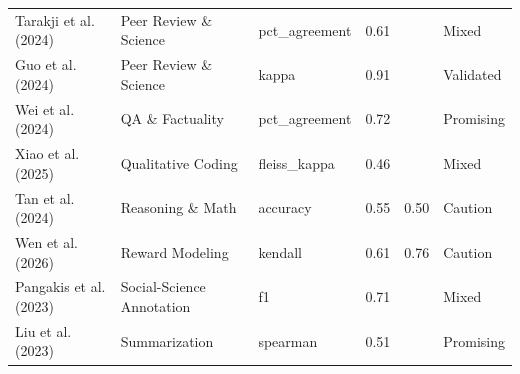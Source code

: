 \begin{tabular}{@{}l l l c c l@{}}
Tarakji et al. (2024) & Peer Review \& Science & pct\_agreement & 0.61 &  & Mixed \\
Guo et al. (2024) & Peer Review \& Science & kappa & 0.91 &  & Validated \\
Wei et al. (2024) & QA \& Factuality & pct\_agreement & 0.72 &  & Promising \\
Xiao et al. (2025) & Qualitative Coding & fleiss\_kappa & 0.46 &  & Mixed \\
Tan et al. (2024) & Reasoning \& Math & accuracy & 0.55 & 0.50 & Caution \\
Wen et al. (2026) & Reward Modeling & kendall & 0.61 & 0.76 & Caution \\
Pangakis et al. (2023) & Social-Science Annotation & f1 & 0.71 &  & Mixed \\
Liu et al. (2023) & Summarization & spearman & 0.51 &  & Promising \\
\bottomrule
\end{tabular}